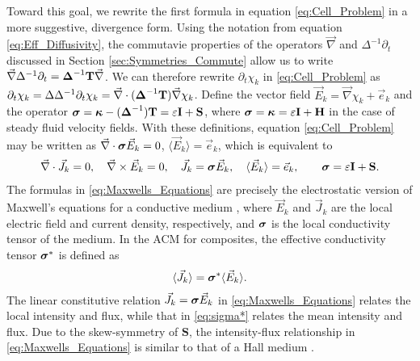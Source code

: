 \documentclass[11pt]{amsart}
\newcommand{\Tb}{\mathbf{T}}
\newcommand{\Hb}{\mathbf{H}}
\newcommand{\Ib}{\mathbf{I}}
\newcommand{\Sb}{\mathbf{S}}
\newcommand\bsig{\mbox{\boldmath${\sigma}$}}
\newcommand\bDelta{\mbox{\boldmath${\Delta}$}}
\newcommand\bkappa{\mbox{\boldmath${\kappa}$}}
\begin{document}
Toward this goal, we rewrite the first formula in equation
\eqref{eq:Cell_Problem} in a more suggestive, divergence form. Using
the notation from equation \eqref{eq:Eff_Diffusivity}, the commutavie
properties of the operators $\vec{\nabla}$ and $\Delta^{-1}\partial_t$ discussed in
Section \ref{sec:Symmetries_Commute} allow us to write
$\vec{\nabla}\Delta^{-1}\partial_t=\bDelta^{-1}\Tb\vec{\nabla}$. We can therefore rewrite
$\partial_t\chi_k$ in \eqref{eq:Cell_Problem} as \cite{Fannjiang:SIAM_JAM:333}  
$\partial_t\chi_k=\Delta\Delta^{-1}\partial_t\chi_k=\vec{\nabla}\cdot(\bDelta^{-1}\Tb)\vec{\nabla}\chi_k$. Define the
vector field $\vec{E}_k=\vec{\nabla}\chi_k+\vec{e}_k$ and the operator
$\bsig=\bkappa-(\bDelta^{-1})\Tb=\varepsilon\Ib+\Sb$, where
$\bsig=\bkappa=\varepsilon\Ib+\Hb$ in the case of steady fluid velocity
fields. With these definitions, equation \eqref{eq:Cell_Problem} may
be written as  $\vec{\nabla}\cdot\bsig\vec{E}_k=0$, $\langle\vec{E}_k\rangle=\vec{e}_k$,
which is equivalent to    
%
\begin{align}\label{eq:Maxwells_Equations}    
  \vec{\nabla}\cdot\vec{J}_k=0, \quad
  \vec{\nabla}\times\vec{E}_k=0, \quad
  \vec{J}_k=\bsig\vec{E}_k,\quad
  \langle\vec{E}_k\rangle=\vec{e}_k,\qquad
  \bsig%
       =\varepsilon\Ib+\Sb.
\end{align}
%
The formulas in \eqref{eq:Maxwells_Equations} are precisely the
electrostatic version of Maxwell's equations for a conductive medium
\cite{Golden:CMP-473}, where $\vec{E}_k$ and $\vec{J}_k$ are the local
electric field and current density, respectively, and $\bsig$ is the
local conductivity tensor of the medium. In the ACM for composites,
the effective conductivity tensor $\bsig^*$ is defined as
% 
\begin{align}\label{eq:sigma*}
  \langle\vec{J}_k\rangle=\bsig^*\langle\vec{E}_k\rangle.
\end{align}
%
The linear constitutive relation $\vec{J}_k=\bsig\vec{E}_k$ in
\eqref{eq:Maxwells_Equations} relates the local intensity and flux,
while that in \eqref{eq:sigma*} relates the mean intensity and
flux. Due to the skew-symmetry of $\Sb$, the intensity-flux
relationship in \eqref{eq:Maxwells_Equations} is similar to that of a
Hall medium \cite{Isichenko:JNS:1991:375}.
\end{document}
